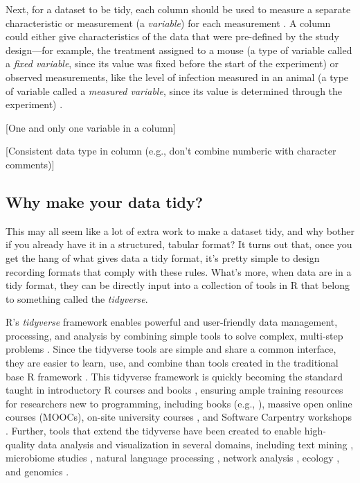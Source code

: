 \documentclass[]{tufte-book}
\begin{document}
Next, for a dataset to be tidy, each column should be used
to measure a separate characteristic or measurement (a \emph{variable}) for each
measurement \citep{wickham2014tidy}. A column could either give characteristics of
the data that were pre-defined by the study design---for example, the treatment
assigned to a mouse (a type of variable called a \emph{fixed variable}, since its
value was fixed before the start of the experiment) or observed measurements,
like the level of infection measured in an animal (a type of variable called a
\emph{measured variable}, since its value is determined through the experiment)
\citep{wickham2014tidy}.

{[}One and only one variable in a column{]}

{[}Consistent data type in column (e.g., don't combine numberic with character
comments){]}

\subsection{Why make your data tidy?}\label{why-make-your-data-tidy}

This may all seem like a lot of extra work to make a dataset tidy, and why
bother if you already have it in a structured, tabular format? It turns out
that, once you get the hang of what gives data a tidy format, it's pretty
simple to design recording formats that comply with these rules. What's more,
when data are in a tidy format, they can be directly input into a collection
of tools in R that belong to something called the \emph{tidyverse}.

R's \emph{tidyverse} framework enables powerful and user-friendly data management,
processing, and analysis by combining simple tools to solve complex, multi-step
problems \citep{ross2017declutter, silge2016tidytext, wickham2016ggplot2, wickham2016r}. Since the tidyverse tools are simple and share a common
interface, they are easier to learn, use, and combine than tools created in the
traditional base R framework \citep{ross2017declutter, lowndes2017our, mcnamara2016state}. This tidyverse framework is quickly becoming the standard
taught in introductory R courses and books \citep{hicks2017guide, baumer2015data, kaplan2018teaching, stander2017enthusing, mcnamara2016state}, ensuring ample training resources for researchers new to
programming, including books (e.g., \citep{baumer2017modern, lifesciencesR, wickham2016r}), massive open online courses (MOOCs), on-site university courses
\citep{baumer2015data, kaplan2018teaching, stander2017enthusing}, and Software
Carpentry workshops \citep{wilson2014software, pawlik2017developing}. Further, tools
that extend the tidyverse have been created to enable high-quality data
analysis and visualization in several domains, including text mining
\citep{silge2017text}, microbiome studies \citep{mcmurdie2013phyloseq}, natural language
processing \citep{RJ-2017-035}, network analysis \citep{RJ-2017-023}, ecology
\citep{hsieh2016inext}, and genomics \citep{yin2012ggbio}.
\end{document}
